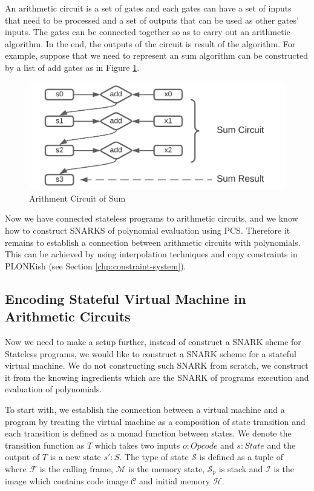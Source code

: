 An arithmetic circuit is a set of gates and each gates can have a set of inputs that need to be processed and a set of outputs that can be used as other gates' inputs. The gates can be connected together so as to carry out an arithmetic algorithm. In the end, the outputs of the circuit is result of the algorithm. For example, suppose that we need to represent an sum algorithm can be constructed by a list of add gates as in Figure \ref{fig:sum-gates}.

\begin{figure}[!ht]
\centerline{
\includegraphics[scale=0.8]{figs/arithment-circuit.png}
}
\caption{Arithment Circuit of Sum}\label{fig:sum-gates}
\end{figure}

Now we have connected stateless programs to arithmetic circuits, and we know how to construct SNARKS of polynomial evaluation using PCS. Therefore it remains to establish a connection between arithmetic circuits with polynomials. This can be achieved by using interpolation techniques and copy constraints in PLONKish (see Section \ref{chp:constraint-system}).

\subsection{Encoding Stateful Virtual Machine in Arithmetic Circuits}
Now we need to make a setup further, instead of construct a SNARK sheme for Stateless programs, we would like to construct a SNARK scheme for a stateful virtual machine. We do not constructing such SNARK from scratch, we construct it from the knowing ingredients which are the SNARK of programs execution and evaluation of polynomials. 

To start with, we establish the connection between a virtual machine and a program by treating the virtual machine as a composition of state transition and each transition is defined as a monad function between states. We denote the transition function as $T$ which takes two inputs $o:Opcode$ and $s:State$
and the output of $T$ is a new state $s':S$. The type of state $\mathcal{S}$ is defined as a tuple of \fullstate \, where $\mathcal{F}$ is the calling frame, $\mathcal{M}$ is the memory state, $\mathcal{S}_p$ is stack and $\mathcal{I}$ is the image which contains code image $\mathcal{C}$ and initial memory $\mathcal{H}$.

